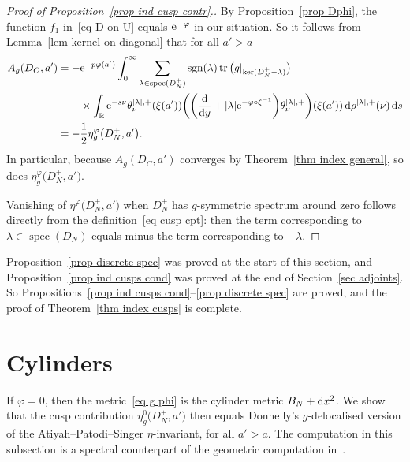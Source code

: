 \documentclass[10pt,a4paper]{amsart}
\numberwithin{equation}{section}
\DeclareMathOperator{\tr}{tr}
\DeclareMathOperator{\spec}{spec}
\DeclareMathOperator{\sgn}{sgn}
\newcommand{\R}{\mathbb{R}}
\begin{document}
\begin{proof}[Proof of Proposition~\ref{prop ind cusp contr}.]
By Proposition~\ref{prop Dphi}, the function $f_1$ in~\eqref{eq D on U} equals ${\rm e}^{-\varphi}$ in our situation. So it
 follows from Lemma~\ref{lem kernel on diagonal} that for all $a'>a$
 \begin{align}
 A_{g}(D_C, a') = - &{\rm e}^{-p \varphi(a')} \int_{0}^{\infty}
\sum_{\lambda \in \spec(D_N^+)}\sgn(\lambda)\tr\big(g|_{\ker(D_N^+ - \lambda)}\big)\nonumber
\\
&\times\int_{\R}{\rm e}^{-s\nu} \theta^{|\lambda|, +}_{\nu} (\xi(a')) \bigg( \bigg( \frac{\rm d}{{\rm d}y}+|\lambda| {\rm e}^{-\varphi \circ \xi^{-1}}\bigg) \theta^{|\lambda|, +}_{\nu} \bigg)(\xi(a'))\,{\rm d}\rho^{|\lambda|, +}(\nu) \, {\rm d}s\nonumber
 \\
 =-&\frac{1}{2}\eta_g^{\varphi}\big(D_N^+, a'\big).
\label{eq comp Ag}
 \end{align}
 In particular, because $A_{g}(D_C, a')$ converges by Theorem~\ref{thm index general}, so does $\eta_g^{\varphi}\big(D_N^+, a'\big)$.

Vanishing of $\eta^{\varphi}\big(D_N^+, a'\big)$ when $D_N^+$ has $g$-symmetric spectrum around zero follows directly from the definition~\eqref{eq cusp cpt}: then the term corresponding to $\lambda \in \spec(D_N)$ equals minus the term corresponding to $-\lambda$.
\end{proof}

Proposition~\ref{prop discrete spec} was proved at the start of this section, and Proposition~\ref{prop ind cusps cond} was proved at the end of Section~\ref{sec adjoints}. So Propositions~\ref{prop ind cusps cond}--\ref{prop discrete spec} are proved, and the proof of Theorem~\ref{thm index cusps} is complete.


\section{Cylinders}%

If $\varphi = 0$, then the metric~\eqref{eq g phi} is the cylinder metric $B_N + {\rm d}x^2$. We show that the cusp contribution $\eta^0_g\big(D_N^+, a'\big)$ then equals Donnelly's $g$-delocalised version of the Atiyah--Patodi--Singer $\eta$-invariant, for all $a'>a$. The computation in this subsection is a spectral counterpart of the geometric computation in~\cite[Section~4]{HW21a}.
\end{document}
